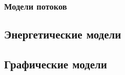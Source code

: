 

\subsubsection{Модели потоков}


\subsection{Энергетические модели}



\subsection{Графические модели}




